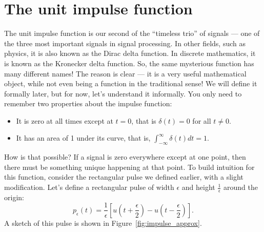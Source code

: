 \section{The unit impulse function}
The unit impulse function is our second of the ``timeless trio'' of signals --- one of the three most important signals in signal processing. In other fields, such as physics, it is also known as the Dirac delta function. In discrete mathematics, it is known as the Kronecker delta function. So, the same mysterious function has many different names! The reason is clear --- it is a very useful mathematical object, while not even being a function in the traditional sense! We will define it formally later, but for now, let's understand it informally. You only need to remember two properties about the impulse function:
\begin{itemize}
    \item It is zero at all times except at $t = 0$, that is $\delta(t) = 0$ for all $t \neq 0$.
    \item It has an area of 1 under its curve, that is, $\int_{-\infty}^{\infty} \delta(t) dt = 1$.
\end{itemize}
How is that possible? If a signal is zero everywhere except at one point, then there must be something unique happening at that point. To build intuition for this function, consider the rectangular pulse we defined earlier, with a slight modification. Let's define a rectangular pulse of width $\epsilon$ and height $\frac{1}{\epsilon}$ around the origin:
\[
p_\epsilon(t) = \frac{1}{\epsilon} \left[u\left(t + \frac{\epsilon}{2}\right) - u\left(t - \frac{\epsilon}{2}\right)\right].
\]
A sketch of this pulse is shown in Figure~\ref{fig:impulse_approx}. 

